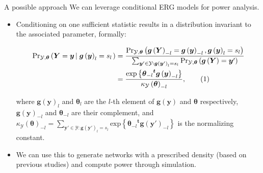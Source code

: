 \documentclass[
  ignorenonframetext,
  aspectratio=169,
]{beamer}
\begin{document}
\begin{frame}{A possible approach}
\protect\hypertarget{a-possible-approach}{}
We can leverage conditional ERG models for power analysis.

\begin{itemize}
\item
  Conditioning on one sufficient statistic results in a distribution
  invariant to the associated parameter, formally:

  \begin{align}
  \notag%
    {\mbox{Pr}_{\mathcal{Y},\boldsymbol{\theta}}\left(\boldsymbol{Y}= \boldsymbol{y}\left|\;\boldsymbol{g}\left(\boldsymbol{y}\right)_l = s_l\right.\right)}%
      & = \frac{%
    {\mbox{Pr}_{\mathcal{Y},\boldsymbol{\theta}}\left(\boldsymbol{g}\left(\boldsymbol{Y}\right)_{-l} = \boldsymbol{g}\left(\boldsymbol{y}\right)_{-l}, \boldsymbol{g}\left(\boldsymbol{y}\right)_l = s_l\right) }
  }{%
    \sum_{\boldsymbol{y}'\in\mathcal{Y}:\boldsymbol{g}\left(\boldsymbol{y}'\right)_l = s_l}{\mbox{Pr}_{\mathcal{Y},\boldsymbol{\theta}}\left(\boldsymbol{g}\left(\boldsymbol{Y}\right) = \boldsymbol{y}'\right) }%
  } \\ & =  %
  \frac{%
    \mbox{exp}\left\{{\boldsymbol{\theta}_{-l}}^{\boldsymbol{t}}\boldsymbol{g}\left(\boldsymbol{y}\right)_{-l}\right\}
  }{%
    \kappa_{\mathcal{Y}}\left(\boldsymbol{\theta}\right)_{-l}
  }, \tag{1}
  \end{align}

  where \(\boldsymbol{g}\left(\boldsymbol{y}\right)_l\) and
  \(\boldsymbol{\theta}_l\) are the \(l\)-th element of
  \(\boldsymbol{g}\left(\boldsymbol{y}\right)\) and
  \(\boldsymbol{\theta}\) respectively,
  \(\boldsymbol{g}\left(\boldsymbol{y}\right)_{-l}\) and
  \(\boldsymbol{\theta}_{-l}\) are their complement, and
  \(\kappa_{\mathcal{Y}}\left(\boldsymbol{\theta}\right)_{-l} = \sum_{\boldsymbol{y}' \in \mathcal{Y}: \boldsymbol{g}\left(\boldsymbol{y}'\right)_l = s_l}\mbox{exp}\left\{{\boldsymbol{\theta}_{-l}}^{\boldsymbol{t}}\boldsymbol{g}\left(\boldsymbol{y}'\right)_{-l}\right\}\)
  is the normalizing constant.
\item
  We can use this to generate networks with a prescribed density (based
  on previous studies) and compute power through simulation.
\end{itemize}
\end{frame}
\end{document}
